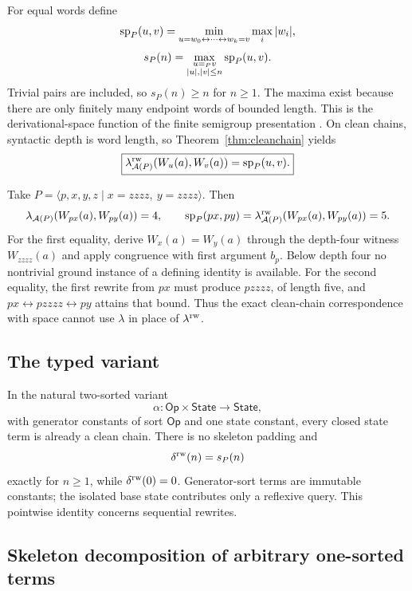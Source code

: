 For equal words define
\[
\operatorname{sp}_P(u,v)=
\min_{u=w_0\leftrightarrow\cdots\leftrightarrow w_k=v}
\max_i|w_i|,
\]
\[
s_P(n)=
\max_{\substack{u=_Pv\\|u|,|v|\le n}}
\operatorname{sp}_P(u,v).
\]
Trivial pairs are included, so $s_P(n)\ge n$ for $n\ge1$. The maxima exist because there are only finitely many endpoint words of bounded length. This is the derivational-space function of the finite semigroup presentation \cite{Olshanskii2013}.  On clean chains, syntactic depth is word length, so Theorem~\ref{thm:cleanchain} yields
\begin{equation}
\boxed{
\lambda^{\mathrm{rw}}_{\mathcal A(P)}(W_u(a),W_v(a))
=
\operatorname{sp}_P(u,v).}
\label{eq:chainspace}
\end{equation}

\begin{example}\label{ex:chaingap}
Take $P=\langle p,x,y,z\mid x=zzzz,\ y=zzzz\rangle$. Then
\[
\lambda_{\mathcal A(P)}(W_{px}(a),W_{py}(a))=4,
\qquad
\operatorname{sp}_P(px,py)=\lambda^{\mathrm{rw}}_{\mathcal A(P)}(W_{px}(a),W_{py}(a))=5.
\]
For the first equality, derive $W_x(a)=W_y(a)$ through the depth-four witness $W_{zzzz}(a)$ and apply congruence with first argument $b_p$. Below depth four no nontrivial ground instance of a defining identity is available. For the second equality, the first rewrite from $px$ must produce $pzzzz$, of length five, and $px\leftrightarrow pzzzz\leftrightarrow py$ attains that bound. Thus the exact clean-chain correspondence with space cannot use $\lambda$ in place of $\lambda^{\mathrm{rw}}$.
\end{example}

\subsection{The typed variant}
In the natural two-sorted variant
\[
\alpha:\mathsf{Op}\times\mathsf{State}\to\mathsf{State},
\]
with generator constants of sort $\mathsf{Op}$ and one state constant, every closed state term is already a clean chain.  There is no skeleton padding and
\[
\delta^{\mathrm{rw}}(n)=s_P(n)
\]
exactly for $n\ge1$, while $\delta^{\mathrm{rw}}(0)=0$. Generator-sort terms are immutable constants; the isolated base state contributes only a reflexive query. This pointwise identity concerns sequential rewrites.

\subsection{Skeleton decomposition of arbitrary one-sorted terms}

